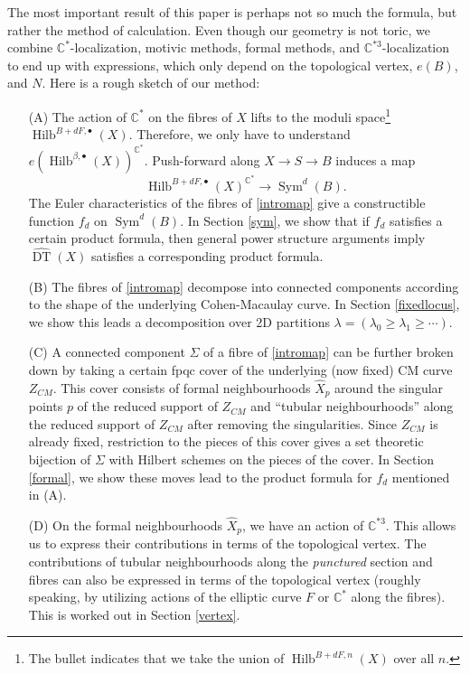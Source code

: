 \documentclass{amsart}
\theoremstyle{definition}
\newcommand{\CC} {\mathbb{C}}          %
\newcommand{\Sym}{\operatorname{Sym}}
\newcommand{\Hilb}{\operatorname{Hilb}}
\newcommand{\DT}{\operatorname{DT}}
\begin{document}
The most important result of this paper is perhaps not so much the formula, but rather the method of calculation. Even though our geometry is not toric, we combine $\CC^*$-localization, motivic methods, formal methods, and $\CC^{*3}$-localization to end up with expressions, which only depend on the topological vertex, $e(B)$, and $N$. Here is a rough sketch of our method:
\begin{enumerate}
\item[(A)] The action of $\CC^*$ on the fibres of $X$ lifts to the moduli space\footnote{The bullet indicates that we take the union of $\Hilb^{B+dF,n}(X)$ over all $n$.} $\Hilb^{B+dF,\bullet}(X)$. Therefore, we only have to understand $e(\Hilb^{\beta,\bullet}(X))^{\CC^*}$. Push-forward along $X \rightarrow S \rightarrow B$ induces a map 
\begin{equation} \label{intromap}
\Hilb^{B+dF,\bullet}(X)^{\CC^*} \rightarrow \Sym^d(B).
\end{equation}
The Euler characteristics of the fibres of \eqref{intromap} give a constructible function $f_d$ on $\Sym^d(B)$. In Section \ref{sym}, we show that if $f_d$ satisfies a certain product formula, then general power structure arguments imply $\widehat{\DT}(X)$ satisfies a corresponding product formula.
\item[(B)] The fibres of \eqref{intromap} decompose into connected components according to the shape of the underlying Cohen-Macaulay curve. In Section \ref{fixedlocus}, we show this leads a decomposition over 2D partitions $\lambda = (\lambda_0 \geq \lambda_1 \geq \cdots)$.
\item[(C)] A connected component $\Sigma$ of a fibre of \eqref{intromap} can be further broken down by taking a certain fpqc cover of the underlying (now fixed) CM curve $Z_{CM}$. This cover consists of formal neighbourhoods $\widehat{X}_p$ around the singular points $p$ of the reduced support of $Z_{CM}$ and ``tubular neighbourhoods'' along the reduced support of $Z_{CM}$ after removing the singularities. Since $Z_{CM}$ is already fixed, restriction to the pieces of this cover gives a set theoretic bijection of $\Sigma$ with Hilbert schemes on the pieces of the cover. In Section \ref{formal}, we show these moves lead to the product formula for $f_d$ mentioned in (A).
\item[(D)] On the formal neighbourhoods $\widehat{X}_p$, we have an action of $\CC^{*3}$. This allows us to express their contributions in terms of the topological vertex. The contributions of tubular neighbourhoods along the \emph{punctured} section and fibres can also be expressed in terms of the topological vertex (roughly speaking, by utilizing actions of the elliptic curve $F$ or $\CC^*$ along the fibres). This is worked out in Section \ref{vertex}.
\end{enumerate}
\end{document}
